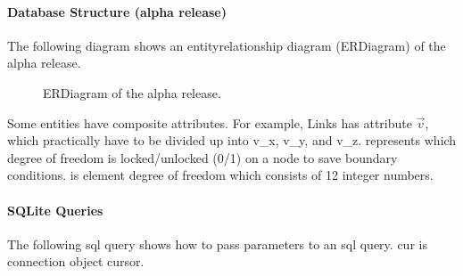 \documentclass[letterpaper,10pt,english]{sphinxmanual}
\begin{document}
\paragraph{Database Structure (alpha release)}
\label{\detokenize{implementation:database-structure-alpha-release}}
The following diagram shows an entity\sphinxhyphen{}relationship diagram (ER\sphinxhyphen{}Diagram) of the alpha release.

\begin{figure}[htbp]
\centering
\capstart

\noindent{}
\caption{ER\sphinxhyphen{}Diagram of the alpha release.}\label{\detokenize{implementation:id1}}\end{figure}

Some entities have composite attributes. For example, Links has attribute \(\vec{v}\), which practically
have to be divided up into v\_x, v\_y, and v\_z.
 represents which degree of freedom is locked/unlocked (0/1) on a node to save boundary conditions.
 is element degree of freedom which consists of 12 integer numbers.


\paragraph{SQLite Queries}
\label{\detokenize{implementation:sqlite-queries}}
The following sql query shows how to pass parameters to an sql query.
cur is connection object cursor.

\begin{sphinxVerbatim}[commandchars=\\\{\}]
 
  
  
  
\end{sphinxVerbatim}
\end{document}
